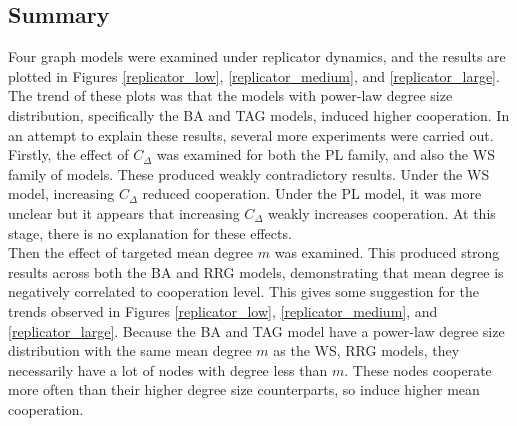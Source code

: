 \subsection{Summary}
Four graph models were examined under replicator dynamics, and the results are plotted in Figures \ref{replicator_low}, \ref{replicator_medium}, and \ref{replicator_large}. The trend of these plots was that the models with power-law degree size distribution, specifically the BA and TAG models, induced higher cooperation. In an attempt to explain these results, several more experiments were carried out. \\

Firstly, the effect of $C_\Delta$ was examined for both the PL family, and also the WS family of models. These produced weakly contradictory results. Under the WS model, increasing $C_\Delta$ reduced cooperation. Under the PL model, it was more unclear but it appears that increasing $C_\Delta$ weakly increases cooperation. At this stage, there is no explanation for these effects. \\

Then the effect of targeted mean degree $m$ was examined. This produced strong results across both the BA and RRG models, demonstrating that mean degree is negatively correlated to cooperation level. This gives some suggestion for the trends observed in Figures \ref{replicator_low}, \ref{replicator_medium}, and \ref{replicator_large}. Because the BA and TAG model have a power-law degree size distribution with the same mean degree $m$ as the WS, RRG models, they necessarily have a lot of nodes with degree less than $m$. These nodes cooperate more often than their higher degree size counterparts, so induce higher mean cooperation. 

